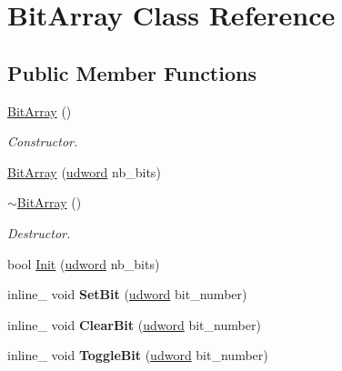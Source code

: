 \hypertarget{class_bit_array}{\section{Bit\+Array Class Reference}
\label{class_bit_array}
}
\subsection*{Public Member Functions}
\begin{DoxyCompactItemize}
\item 
\hyperlink{class_bit_array_a611f4d891d6f6db51468448da73d3f1e}{Bit\+Array} ()
\begin{DoxyCompactList}\small\item\em Constructor. \end{DoxyCompactList}\item 
\hyperlink{class_bit_array_adcd07fe8836f9b5ee11de988310e4e93}{Bit\+Array} (\hyperlink{_ice_types_8h_a44c6f1920ba5551225fb534f9d1a1733}{udword} nb\+\_\+bits)
\item 
\hyperlink{class_bit_array_a8f4d14141e3c7093ac8558604710736f}{$\sim$\+Bit\+Array} ()
\begin{DoxyCompactList}\small\item\em Destructor. \end{DoxyCompactList}\item 
bool \hyperlink{class_bit_array_af185d5fd39c15a3ee2d9f66a453f6bc0}{Init} (\hyperlink{_ice_types_8h_a44c6f1920ba5551225fb534f9d1a1733}{udword} nb\+\_\+bits)
\item 
\hypertarget{class_bit_array_a885beef2dc8ceec07a644a5ca692d644}{inline\+\_\+ void {\bfseries Set\+Bit} (\hyperlink{_ice_types_8h_a44c6f1920ba5551225fb534f9d1a1733}{udword} bit\+\_\+number)}\label{class_bit_array_a885beef2dc8ceec07a644a5ca692d644}

\item 
\hypertarget{class_bit_array_aaf6d8ae6fe57aa4199e5484e21681363}{inline\+\_\+ void {\bfseries Clear\+Bit} (\hyperlink{_ice_types_8h_a44c6f1920ba5551225fb534f9d1a1733}{udword} bit\+\_\+number)}\label{class_bit_array_aaf6d8ae6fe57aa4199e5484e21681363}

\item 
\hypertarget{class_bit_array_a125ec6970423f5576afc7092aefbcc0c}{inline\+\_\+ void {\bfseries Toggle\+Bit} (\hyperlink{_ice_types_8h_a44c6f1920ba5551225fb534f9d1a1733}{udword} bit\+\_\+number)}\label{class_bit_array_a125ec6970423f5576afc7092aefbcc0c}


\end{DoxyCompactItemize}
